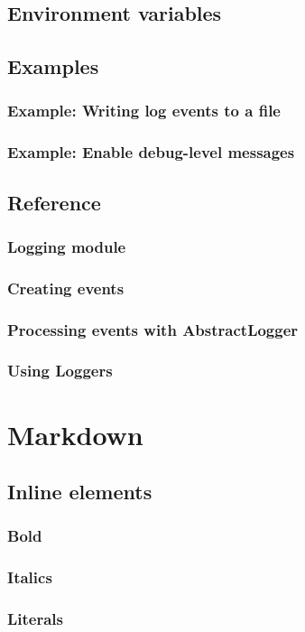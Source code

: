     \section{Environment variables}
    \section{Examples}
    \subsection{Example: Writing log events to a file}
    \subsection{Example: Enable debug-level messages}
    \section{Reference}
    \subsection{Logging module}
    \subsection{Creating events}
    \subsection{Processing events with AbstractLogger}
    \subsection{Using Loggers}
  \chapter{Markdown}
    \section{Inline elements}
    \subsection{Bold}
    \subsection{Italics}
    \subsection{Literals}
